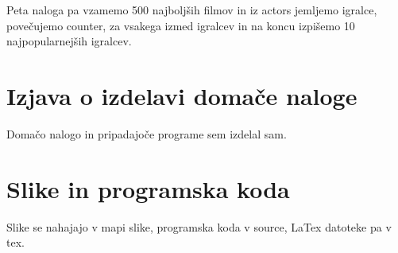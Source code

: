 \documentclass[a4paper,11pt]{article}
\begin{document}
  Peta naloga pa vzamemo 500 najboljših filmov in iz actors jemljemo igralce, povečujemo counter, za vsakega izmed igralcev in na koncu izpišemo 10 najpopularnejših igralcev.
  

\section{Izjava o izdelavi domače naloge}
Domačo nalogo in pripadajoče programe sem izdelal sam.

\appendix
\appendixpage
\section{\label{app-res}Slike in programska koda}

Slike se nahajajo v mapi slike, programska koda v source, LaTex datoteke pa v tex.
\end{document}
